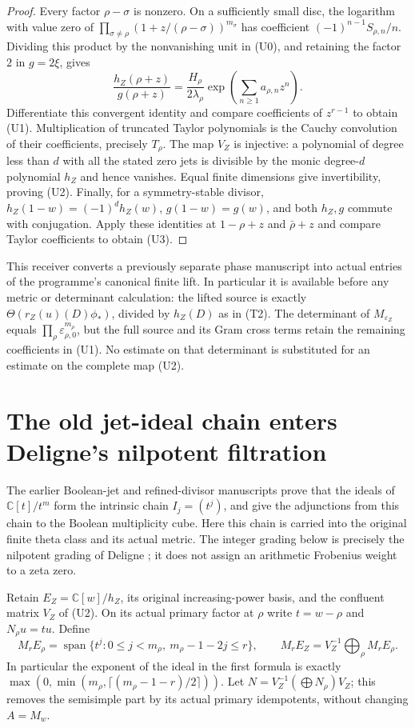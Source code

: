 \documentclass[11pt]{article}
\newcommand{\C}{\mathbb C}\newcommand{\R}{\mathbb R}
\begin{document}
\begin{proof}
Every factor $\rho-\sigma$ is nonzero. On a sufficiently small disc,
the logarithm with value zero of
$\prod_{\sigma\ne\rho}(1+z/(\rho-\sigma))^{m_\sigma}$ has
coefficient $(-1)^{n-1}S_{\rho,n}/n$. Dividing this product by the
nonvanishing unit in (U0), and retaining the factor $2$ in $g=2\xi$,
gives
\[
 \frac{h_Z(\rho+z)}{g(\rho+z)}
   =\frac{H_\rho}{2\lambda_\rho}
                        \exp\!\left(\sum_{n\geq1}a_{\rho,n}z^n\right).
\]
Differentiate this convergent identity and compare coefficients of
$z^{r-1}$ to obtain (U1). Multiplication of truncated Taylor polynomials
is the Cauchy convolution of their coefficients, precisely $T_\rho$.
The map $V_Z$ is injective: a polynomial of degree less than $d$ with
all the stated zero jets is divisible by the monic degree-$d$ polynomial
$h_Z$ and hence vanishes. Equal finite dimensions give invertibility,
proving (U2). Finally, for a symmetry-stable divisor,
$h_Z(1-w)=(-1)^d h_Z(w)$, $g(1-w)=g(w)$, and both $h_Z,g$ commute
with conjugation. Apply these identities at $1-\rho+z$ and
$\bar\rho+z$ and compare Taylor coefficients to obtain (U3).
\end{proof}

This receiver converts a previously separate phase manuscript into actual
entries of the programme's canonical finite lift. In particular it is
available before any metric or determinant calculation: the lifted source
is exactly
$\Theta(r_Z(u)(D)\phi_*)$, divided by $h_Z(D)$ as in (T2).
The determinant of $M_{\varepsilon_Z}$ equals
$\prod_\rho\varepsilon_{\rho,0}^{m_\rho}$, but the full source and
its Gram cross terms retain the remaining coefficients in (U1).
No estimate on that determinant is substituted for an estimate on the
complete map (U2).

\section{The old jet-ideal chain enters Deligne's nilpotent filtration}
The earlier Boolean-jet and refined-divisor manuscripts prove that the
ideals of $\C[t]/t^m$ form the intrinsic chain
$I_j=(t^j)$, and give the adjunctions from this chain to the Boolean
multiplicity cube. Here this chain is carried into the original finite
theta class and its actual metric. The integer grading below is precisely
the nilpotent grading of Deligne \cite[(1.6.1),(1.6.7)]{DeligneII}; it
does not assign an arithmetic Frobenius weight to a zeta zero.

Retain $E_Z=\C[w]/h_Z$, its original increasing-power basis, and the
confluent matrix $V_Z$ of (U2). On its actual primary factor at $\rho$
write $t=w-\rho$ and $N_\rho u=tu$. Define
\[
 M_rE_\rho=
 \operatorname{span}\{t^j:0\leq j<m_\rho,\ m_\rho-1-2j\leq r\},
 \qquad M_rE_Z=V_Z^{-1}\!\bigoplus_\rho M_rE_\rho.
 \tag{N1}
\]
In particular the exponent of the ideal in the first formula is exactly
$\max(0,\min(m_\rho,\lceil(m_\rho-1-r)/2\rceil))$.
Let $N=V_Z^{-1}(\bigoplus N_\rho)V_Z$; this removes the semisimple
part by its actual primary idempotents, without changing $A=M_w$.
\end{document}
